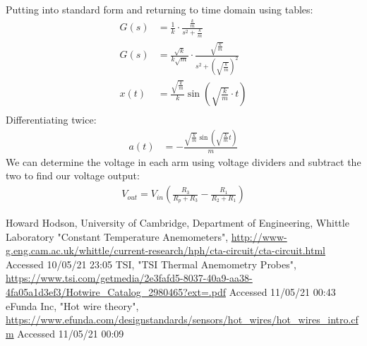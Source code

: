 \documentclass[11pt]{article}
\numberwithin{equation}{section}
\begin{document}
Putting into standard form and returning to time domain using tables:
\begin{align}
    G(s) &= \frac{1}{k}\cdot\frac{\frac{k}{m}}{s^2 + \frac{k}{m}}\\
    G(s) &= \frac{\sqrt{k}}{k\sqrt{m}}\cdot \frac{\sqrt{\frac{k}{m}}}{s^2 + \left(\sqrt{\frac{k}{m}}\right)^2}\\
    x(t) &= \frac{\sqrt{\frac{k}{m}}}{k} \sin\left(\sqrt{\frac{k}{m}} \cdot t\right)\\
\end{align}
Differentiating twice:
\begin{align}
    a(t) &= -\frac{\sqrt{\frac{k}{m}}\sin\left(\sqrt{\frac{k}{m}}t\right)}{m}
\end{align}
We can determine the voltage in each arm using voltage dividers and subtract the two to find our voltage output:
\begin{align}
    V_{out} = V_{in}\left(\frac{R_3}{R_p + R_3} - \frac{R_1}{R_2 + R_1}\right)
\end{align}
\begin{thebibliography}{00}
     Howard Hodson, University of Cambridge, Department of Engineering, Whittle Laboratory "Constant Temperature Anemometers", \url{http://www-g.eng.cam.ac.uk/whittle/current-research/hph/cta-circuit/cta-circuit.html} Accessed 10/05/21 23:05 
     TSI, "TSI Thermal Anemometry Probes", \url{https://www.tsi.com/getmedia/2e3fafd5-8037-40a9-aa38-4fa05a1d3ef3/Hotwire_Catalog_2980465?ext=.pdf} Accessed 11/05/21 00:43
     eFunda Inc, "Hot wire theory", \url{https://www.efunda.com/designstandards/sensors/hot_wires/hot_wires_intro.cfm} Accessed 11/05/21 00:09
\end{thebibliography}
\end{document}
